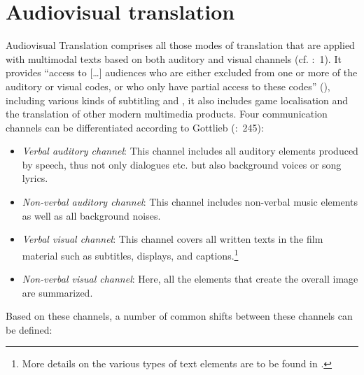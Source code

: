 \chapter{Audiovisual translation}\label{audiovisual}

Audiovisual Translation comprises all those modes of translation that are applied with multimodal texts based on both auditory and visual channels (cf. \citealt{Jungst2010}:~1). It provides “access to […] audiences who are either excluded from one or more of the auditory or visual codes, or who only have partial access to these codes” (\citealt{Kruger????}), including various kinds of subtitling and , it also includes game localisation and the translation of other modern multimedia products. Four communication channels can be differentiated according to Gottlieb (\citeyear{Gottlieb1998}:~245):

\begin{itemize}
\item \textit{Verbal auditory channel}: This channel includes all auditory elements produced by speech, thus not only dialogues etc. but also background voices or song lyrics.
\item \textit{Non-verbal auditory channel}: This channel includes non-verbal music elements as well as all background noises.
\item \textit{Verbal visual channel}: This channel covers all written texts in the film material such as subtitles, displays, and captions.\footnote{More details on the various types of text elements are to be found in .}
\item \textit{Non-verbal visual channel}: Here, all the elements that create the overall image are summarized.
\end{itemize}

Based on these channels, a number of common shifts between these channels can be defined:

